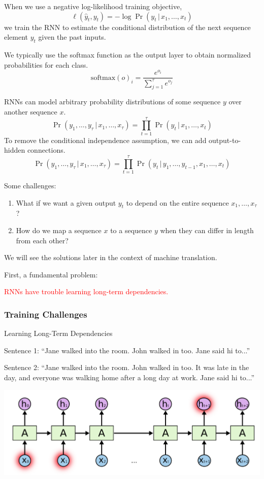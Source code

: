 \documentclass[english]{article}
\begin{document}
When we use a negative log-likelihood training objective,
$$\ell(\hat{y}_t,y_t) = -\log{\Pr(y_t\,|\,x_1,\dots,x_t)}$$
we train the RNN to estimate the conditional distribution of the next sequence element $y_t$ given the past inputs.
 
We typically use the softmax function as the output layer to obtain normalized probabilities for each class.
$$\text{softmax}(o)_i=\frac{e^{o_i}}{\sum_{j=1}^\tau e^{o_j}}$$
 

RNNs can model arbitrary probability distributions of some sequence $y$ over another sequence $x$.
$$\Pr(y_1,\dots,y_\tau\,|\,x_1,\dots,x_\tau) = \prod_{t=1}^\tau \Pr(y_t\,|\,x_1,\dots,x_t)$$
To remove the conditional independence assumption, we can add output-to-hidden connections.
$$\Pr(y_1,\dots,y_\tau\,|\,x_1,\dots,x_\tau) = \prod_{t=1}^\tau \Pr(y_t\,|\,y_1,\dots,y_{t-1}, x_1,\dots,x_t)$$
 

Some challenges:
\begin{enumerate}
\item What if we want a given output $y_t$ to depend on the entire sequence $x_1,\dots,x_\tau$?
\item How do we map a sequence $x$ to a sequence $y$ when they can differ in length from each other?
\end{enumerate}
\vspace{5mm}
We will see the solutions later in the context of machine translation.
 
First, a fundamental problem: \begin{center}\textcolor{red}{RNNs have trouble learning long-term dependencies.}\end{center}
 \eenum

\subsubsection{Training Challenges}
\benum
\item 
 {Learning Long-Term Dependencies}

Sentence 1: ``Jane walked into the room. John walked in too. Jane said hi to...'' 

Sentence 2: ``Jane walked into the room. John walked in too. It was late in the day, and everyone was walking home after a long day at work. Jane said hi to...'' 

\begin{center}
\includegraphics[height=0.25\linewidth]{rnn-long-term.png} 
\end{center}
\end{document}
